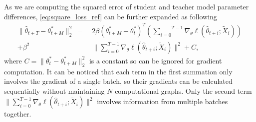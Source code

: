\documentclass[10pt,twocolumn,letterpaper]{article}
\begin{document}
As we are computing the squared error of student and teacher model parameter differences, \cref{eq:square_loss_ref} can be further expanded as following
\begin{align}
\|\hat{\theta}_{t+T} - \theta_{t+M}^*\|_2^2 \ = \ & 
 2\beta(  \theta_{t+M}^* - \theta_t^*)^T(\overset{T-1}{\underset{i=0}{\sum}}\nabla_{\theta} \ell(\hat{\theta}_{t+i};\tilde{X}_i))
  \nonumber \\  +\beta^2 &\|\sum_{i=0}^{T-1} \nabla_\theta \ell(\hat{\theta}_{t+i}; \tilde{X}_i) \|^2 + C, \label{eq:111}
\end{align}
 where $C=\|\theta_{t}^* - \theta_{t+M}^*\|_2^2$ is a constant so can be ignored for gradient computation. It can be noticed that each term in the first  summation only involves the gradient of a single batch, so their gradients can be calculated sequentially without maintaining $N$ computational graphs. Only the second term 
 $\|\sum_{i=0}^{T-1} \nabla_\theta \ell(\hat{\theta}_{t+i}; \tilde{X}_i) \|^2$ involves information from multiple batches together. 
\end{document}
